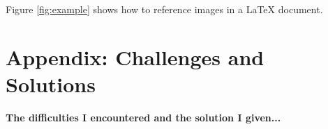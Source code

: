 \documentclass[12pt]{article}
\begin{document}
\lipsum[1][1-3] %



Figure \ref{fig:example} shows how to reference images in a LaTeX document.

\section*{Appendix: Challenges and Solutions}

\textbf{The difficulties I encountered and the solution I given...}

\lipsum[1][1-3] %

\printbibliography
\end{document}

